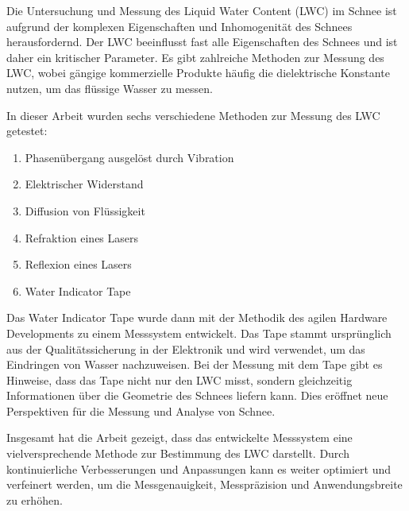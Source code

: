 
Die Untersuchung und Messung des Liquid Water Content (LWC) im Schnee ist aufgrund der komplexen Eigenschaften und Inhomogenität des Schnees herausfordernd. Der LWC beeinflusst fast alle Eigenschaften des Schnees und ist daher ein kritischer Parameter. Es gibt zahlreiche Methoden zur Messung des LWC, wobei gängige kommerzielle Produkte häufig die dielektrische Konstante nutzen, um das flüssige Wasser zu messen. 

In dieser Arbeit wurden sechs verschiedene Methoden zur Messung des LWC getestet:

\begin{enumerate}
    \item Phasenübergang ausgelöst durch Vibration
    \item Elektrischer Widerstand
    \item Diffusion von Flüssigkeit
    \item Refraktion eines Lasers
    \item Reflexion eines Lasers
    \item Water Indicator Tape
\end{enumerate}

Das Water Indicator Tape wurde dann mit der Methodik des agilen Hardware Developments zu einem Messsystem entwickelt. Das Tape stammt ursprünglich aus der Qualitätssicherung in der Elektronik und wird verwendet, um das Eindringen von Wasser nachzuweisen. Bei der Messung mit dem Tape gibt es Hinweise, dass das Tape nicht nur den LWC misst, sondern gleichzeitig Informationen über die Geometrie des Schnees liefern kann. Dies eröffnet neue Perspektiven für die Messung und Analyse von Schnee.

Insgesamt hat die Arbeit gezeigt, dass das entwickelte Messsystem eine vielversprechende Methode zur Bestimmung des LWC darstellt. Durch kontinuierliche Verbesserungen und Anpassungen kann es weiter optimiert und verfeinert werden, um die Messgenauigkeit, Messpräzision und Anwendungsbreite zu erhöhen.
